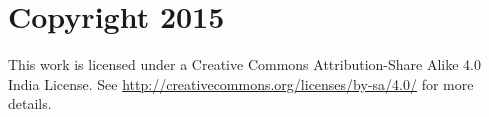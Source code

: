 \chapter*{Copyright \textcopyright{}2015}
  

\noindent This work is licensed under a Creative Commons Attribution-Share Alike 4.0 India License. See \url{http://creativecommons.org/licenses/by-sa/4.0/} for more details.

